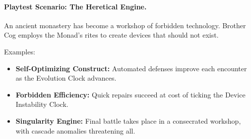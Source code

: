 \paragraph{Playtest Scenario: The Heretical Engine.}  
An ancient monastery has become a workshop of forbidden technology. Brother Cog employs the Monad’s rites to create devices that should not exist.  

Examples:  
\begin{itemize}
  \item \textbf{Self-Optimizing Construct:} Automated defenses improve each encounter as the Evolution Clock advances.  
  \item \textbf{Forbidden Efficiency:} Quick repairs succeed at cost of ticking the Device Instability Clock.  
  \item \textbf{Singularity Engine:} Final battle takes place in a consecrated workshop, with cascade anomalies threatening all.  
\end{itemize}
